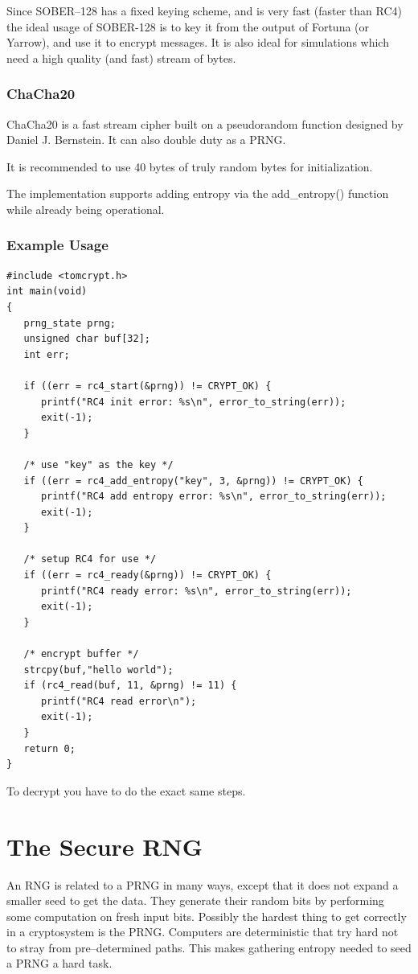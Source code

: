 \documentclass[synpaper]{book}
\newcommand{\mysection}[1]    %
	{                   %
	\section{#1}
   \markboth{\textsf{www.libtom.net}}{\thesection ~ {#1}}
	}
\begin{document}
Since SOBER--128 has a fixed keying scheme, and is very fast (faster than RC4) the ideal usage of SOBER-128 is to
key it from the output of Fortuna (or Yarrow), and use it to encrypt messages.  It is also ideal for
simulations which need a high quality (and fast) stream of bytes.

\subsubsection{ChaCha20}

ChaCha20 is a fast stream cipher built on a pseudorandom function designed by Daniel J. Bernstein.
It can also double duty as a PRNG.

It is recommended to use 40 bytes of truly random bytes for initialization.

The implementation supports adding entropy via the add\_entropy() function while already being operational.

\subsubsection{Example Usage}
\begin{small}
\begin{verbatim}
#include <tomcrypt.h>
int main(void)
{
   prng_state prng;
   unsigned char buf[32];
   int err;

   if ((err = rc4_start(&prng)) != CRYPT_OK) {
      printf("RC4 init error: %s\n", error_to_string(err));
      exit(-1);
   }

   /* use "key" as the key */
   if ((err = rc4_add_entropy("key", 3, &prng)) != CRYPT_OK) {
      printf("RC4 add entropy error: %s\n", error_to_string(err));
      exit(-1);
   }

   /* setup RC4 for use */
   if ((err = rc4_ready(&prng)) != CRYPT_OK) {
      printf("RC4 ready error: %s\n", error_to_string(err));
      exit(-1);
   }

   /* encrypt buffer */
   strcpy(buf,"hello world");
   if (rc4_read(buf, 11, &prng) != 11) {
      printf("RC4 read error\n");
      exit(-1);
   }
   return 0;
}
\end{verbatim}
\end{small}
To decrypt you have to do the exact same steps.

\mysection{The Secure RNG}
An RNG is related to a PRNG in many ways, except that it does not expand a smaller seed to get the data.  They generate their random bits
by performing some computation on fresh input bits.  Possibly the hardest thing to get correctly in a cryptosystem is the
PRNG.  Computers are deterministic that try hard not to stray from pre--determined paths.  This makes gathering entropy needed to seed a PRNG
a hard task.
\end{document}
